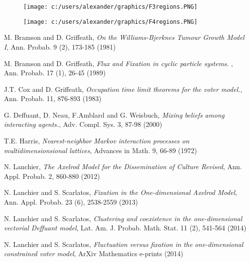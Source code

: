 \documentclass[
paper=128mm:96mm, %
fontsize=11pt, %
pagesize, %
parskip=half-, %
]{scrartcl} %
\theoremstyle{mythmstyle} %
\begin{document}
\begin{figure}[!tbp]
  \centering
  \begin{minipage}[b]{0.50\textwidth}
    \texttt{[image: c:/users/alexander/graphics/F3regions.PNG]}
  \end{minipage}
  \begin{minipage}[b]{0.50\textwidth}
    \texttt{[image: c:/users/alexander/graphics/F4regions.PNG]}
  \end{minipage}
\end{figure}

\clearpage


\begin{thebibliography}{5}

 M. Bramson and D. Griffeath, \emph{On the Williams-Bjerknes Tumour Growth Model I}, Ann. Probab. 9 (2), 173-185 (1981)

 M. Bramson and D. Griffeath, \emph{Flux and Fixation in cyclic particle systems. }, Ann. Probab. 17 (1), 26-45 (1989)

 J.T. Cox and D. Griffeath, \emph{Occupation time limit theorems for the voter model.}, Ann. Probab. 11, 876-893 (1983)

 G. Deffuant, D. Neau, F.Amblard and G. Weisbuch, \emph{Mixing beliefs among interacting agents.}, Adv. Compl. Sys. 3, 87-98 (2000)

 T.E. Harris, \emph{Nearest-neighbor Markov interaction processes on multidimensionsional lattices}, Advances in Math. 9, 66-89 (1972)

 N. Lanchier, \emph{The Axelrod Model for the Dissemination of Culture Revised}, Ann. Appl. Probab. 2, 860-880 (2012)

 N. Lanchier and S. Scarlatos, \emph{Fixation in the One-dimensional Axelrod Model}, Ann. Appl. Probab. 23 (6), 2538-2559 (2013)

 N. Lanchier and S. Scarlatos, \emph{Clustering and coexistence in the one-dimensional vectorial Deffuant model}, Lat. Am. J. Probab. Math. Stat. 11 (2), 541-564 (2014)

 N. Lanchier and S. Scarlatos, \emph{Fluctuation versus fixation in the one-dimensional constrained voter model}, ArXiv Mathematics e-prints (2014)


\end{thebibliography}
\clearpage
\end{document}
